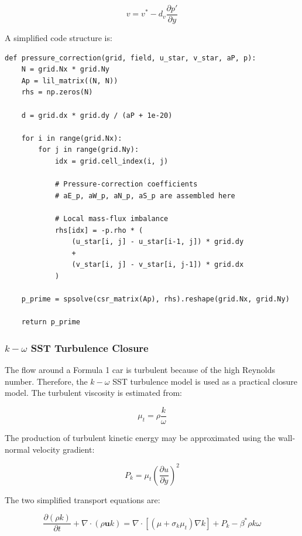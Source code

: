 \documentclass[12pt,a4paper]{article}
\begin{document}
\begin{equation}
    v = v^* - d_v\frac{\partial p'}{\partial y}
\end{equation}

A simplified code structure is:

\begin{lstlisting}[style=cleanPython, caption={Simplified pressure-correction solver structure.}]
def pressure_correction(grid, field, u_star, v_star, aP, p):
    N = grid.Nx * grid.Ny
    Ap = lil_matrix((N, N))
    rhs = np.zeros(N)

    d = grid.dx * grid.dy / (aP + 1e-20)

    for i in range(grid.Nx):
        for j in range(grid.Ny):
            idx = grid.cell_index(i, j)

            # Pressure-correction coefficients
            # aE_p, aW_p, aN_p, aS_p are assembled here

            # Local mass-flux imbalance
            rhs[idx] = -p.rho * (
                (u_star[i, j] - u_star[i-1, j]) * grid.dy
                +
                (v_star[i, j] - v_star[i, j-1]) * grid.dx
            )

    p_prime = spsolve(csr_matrix(Ap), rhs).reshape(grid.Nx, grid.Ny)

    return p_prime
\end{lstlisting}

\subsubsection{$k-\omega$ SST Turbulence Closure}

The flow around a Formula 1 car is turbulent because of the high Reynolds number.
Therefore, the $k-\omega$ SST turbulence model is used as a practical closure model.
The turbulent viscosity is estimated from:

\begin{equation}
    \mu_t = \rho\frac{k}{\omega}
\end{equation}

The production of turbulent kinetic energy may be approximated using the wall-normal
velocity gradient:

\begin{equation}
    P_k = \mu_t\left(\frac{\partial u}{\partial y}\right)^2
\end{equation}

The two simplified transport equations are:

\begin{equation}
    \frac{\partial(\rho k)}{\partial t} + \nabla \cdot (\rho \bm{u}k)= \nabla\cdot\left[(\mu+\sigma_k\mu_t)\nabla k\right] +P_k-\beta^*\rho k\omega
\end{equation}
\end{document}

